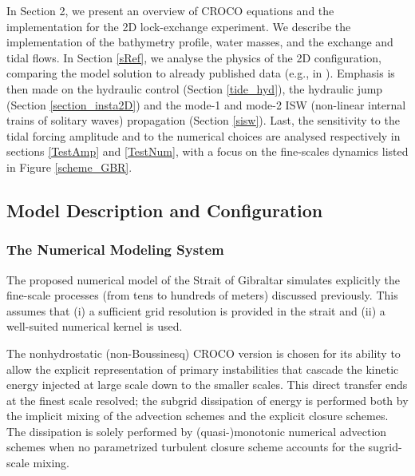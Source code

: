 In Section 2, we present an overview of CROCO equations and the implementation for the 2D lock-exchange experiment. We describe the implementation of the bathymetry profile, water masses, and the exchange and tidal flows. In Section \ref{sRef}, we analyse the physics of the 2D configuration, comparing the model solution to already published data  (e.g., in \citet{FA1988}). Emphasis is then made on the hydraulic control (Section \ref{tide_hyd}), the hydraulic jump (Section \ref{section_insta2D}) and the mode-1 and mode-2 ISW (non-linear internal trains of solitary waves) propagation (Section \ref{sisw}). Last, the sensitivity to the tidal forcing amplitude and to the numerical choices are analysed respectively in sections \ref{TestAmp} and \ref{TestNum}, with a focus on the fine-scales dynamics listed in Figure \ref{scheme_GBR}. 
\subsection{Model Description and Configuration}
\subsubsection{The Numerical Modeling System}
The proposed numerical model of the Strait of Gibraltar simulates explicitly the fine-scale processes (from tens to hundreds of meters) discussed previously. This assumes that (i) a sufficient grid resolution is provided in the strait and (ii) a well-suited numerical kernel is used.

The nonhydrostatic (non-Boussinesq) CROCO version is chosen for its ability to allow the explicit representation of primary instabilities that cascade the kinetic energy injected at large scale down to the smaller scales. This direct transfer ends at the finest scale resolved; the subgrid dissipation of energy is performed both by the implicit mixing of the advection schemes and the explicit closure schemes. The dissipation is solely performed by (quasi-)monotonic numerical advection schemes \citep{Grinstein2007}  when no parametrized turbulent closure scheme accounts for the sugrid-scale mixing.

